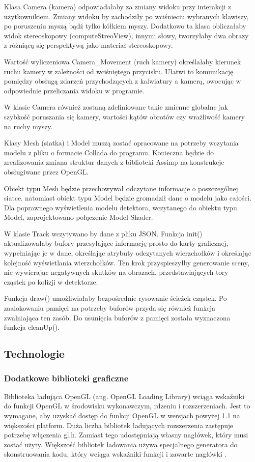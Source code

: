 Klasa Camera (kamera) odpowiadałaby za zmiany widoku przy interakcji z użytkownikiem. Zmiany widoku by zachodziły po wciśnieciu wybranych klawiszy, po poruszeniu myszą bądź tylko kółkiem myszy. Dodatkowo ta klasa obliczałaby widok stereoskopowy (computeStreoView), innymi słowy, tworzyłaby dwa obrazy z różniącą się perspektywą jako materiał stereoskopowy. 

Wartość wyliczeniowa Camera\_Movement (ruch kamery) określałaby kierunek ruchu kamery w zależności od wciśniętego przycisku. Ułatwi to komunikację pomiędzy obsługą zdarzeń przychodzących z kalwiatury a kamerą, owocując w odpowiednie przeliczania widoku w programie. 

W klasie Camera również zostaną zdefiniowane takie zmienne globalne jak szybkość poruszania się kamery, wartości kątów obrotów czy wrażliwość kamery na ruchy myszy.

Klasy Mesh (siatka) i Model muszą zostać opracowane na potrzeby wczytania modelu z pliku o formacie Collada do programu. Konieczna będzie do zrealizowania zmiana struktur danych z biblioteki Assimp na konstrukcje obsługiwane przez OpenGL. 

Obiekt typu Mesh będzie przechowywał odczytane informacje o poszczególnej siatce, natomiast obiekt typu Model będzie gromadził dane o modelu jako całości. Dla poprawnego wyświetlenia modelu detektora, wczytanego do obiektu typu Model, zaprojektowano połączenie Model-Shader.

W klasie Track wczytywano by dane z pliku JSON. Funkcja init() aktualizowałaby bufory przesyłające informację prosto do karty graficznej, wypełniając je w dane, określając atrybuty odczytanych wierzchołków i określając kolejność wyświetlania wierzchołków. Ten krok przyspieszyłby generowanie sceny, nie wywierając negatywnych skutków na obrazach, przedstawiających tory cząstek po kolizji w detektorze.

Funkcja draw() umożliwiałaby bezpośrednie rysowanie ścieżek cząstek. Po zaalokowaniu pamięci na potrzeby buforów przyda się również funkcja zwalniająca ten zasób. Do usunięcia buforów z pamięci została wyznaczona funkcja cleanUp().

\subsection{Technologie}
\subsubsection{Dodatkowe biblioteki graficzne}
Biblioteka ładująca OpenGL (ang. OpenGL Loading Library) wciąga wskaźniki do funkcji OpenGL w środowisku wykonawczym, rdzeniu i rozszerzeniach. Jest to wymagane, aby uzyskać dostęp do funkcji OpenGL w wersjach powyżej 1.1 na większości platform. Duża liczba bibliotek ładujących rozszerzenia zastępuje potrzebę włączenia gl.h. Zamiast tego udostępniają własny nagłówek, który musi zostać użyty. Większość bibliotek ładowania używa specjalnego generatora do skonstruowania kodu, który wciąga wskaźniki funkcji i zawarte nagłówki \cite{LoadingLibrary}. 

